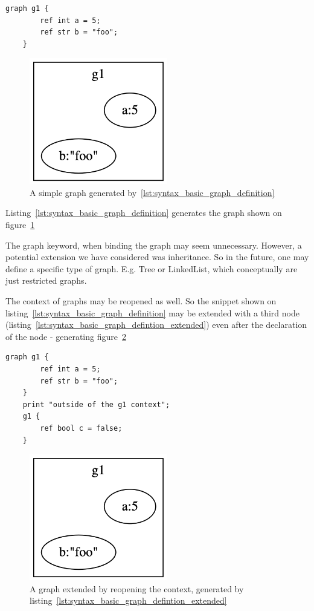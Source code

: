 \begin{lstlisting}[caption={Graph declaration.}, captionpos=b, label={lst:syntax_basic_graph_definition}]
    graph g1 {
        ref int a = 5;
        ref str b = "foo";
    }
\end{lstlisting}

\begin{figure}[H]
    \centering
    \includegraphics[width=6cm]{figures/syntax_section/syntax_simple_graph}
    \caption{A simple graph generated by~\ref{lst:syntax_basic_graph_definition}}
    \label{fig:syntax_basic_graph}
\end{figure}

Listing~\ref{lst:syntax_basic_graph_definition} generates the graph shown on figure~\ref{fig:syntax_basic_graph}

The graph keyword, when binding the graph may seem unnecessary.
However, a potential extension we have considered was inheritance.
So in the future, one may define a specific type of graph.
E.g. Tree or LinkedList, which conceptually are just restricted graphs.

The context of graphs may be reopened as well.
So the snippet shown on listing~\ref{lst:syntax_basic_graph_definition}
may be extended with a third node (listing~\ref{lst:syntax_basic_graph_defintion_extended})
even after the declaration of the node - generating figure~\ref{fig:syntax_basic_graph_extended}

\begin{lstlisting}[caption={Extending a graph.},captionpos=b,label={lst:syntax_basic_graph_defintion_extended}]
    graph g1 {
        ref int a = 5;
        ref str b = "foo";
    }
    print "outside of the g1 context";
    g1 {
        ref bool c = false;
    }
\end{lstlisting}

\begin{figure}[H]
    \centering
    \includegraphics[width=6cm]{figures/syntax_section/syntax_simple_graph}
    \caption{A graph extended by reopening the context, generated by listing~\ref{lst:syntax_basic_graph_defintion_extended}}
    \label{fig:syntax_basic_graph_extended}
\end{figure}

